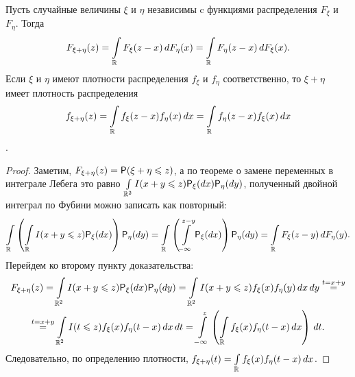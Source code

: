 \begin{lemma}[о свертке]
	Пусть случайные величины $\xi$ и $\eta$ независимы c функциями распределения $F_\xi$ и $F_\eta$. Тогда
	$$ F_{\xi + \eta} (z) = \int\limits_\R F_\xi (z - x) \, dF_\eta (x) = \int\limits_\R F_\eta(z - x) \, d F_\xi(x).$$
	Если $\xi$ и $\eta$ имеют плотности распределения $f_\xi$ и $f_\eta$ соответственно, то $\xi + \eta$ имеет плотность распределения 
	$$f_{\xi + \eta} (z) = \int\limits_\R f_\xi (z - x) f_\eta (x) \, dx = \int\limits_\R f_\eta (z - x) f_\xi(x) \, dx$$.
	\begin{proof}
		Заметим, $F_{\xi + \eta} (z) = \P ( \xi + \eta \leqslant z)$, а по теореме о замене переменных в интеграле Лебега это равно $\int\limits_{\R^2} I(x + y \leqslant z) \P_\xi(dx) \P_\eta(dy)$, полученный двойной интеграл по Фубини можно записать как повторный:
		$$ \int\limits_\R \left( \int\limits_\R I(x + y \leqslant z) \P_\xi(dx) \right) \P_\eta(dy) = \int\limits_\R \left( \int\limits_{-\infty}^{z-y} \P_\xi(dx) \right) \P_\eta(dy) = \int\limits_\R F_\xi(z - y) \, dF_\eta(y).$$
		Перейдем ко второму пункту доказательства:
		\begin{multline*}
			F_{\xi + \eta} (z) = \int\limits_{\R^2} I(x + y \leqslant z) \P_\xi(dx) \P_\eta(dy) = \int\limits_{\R^2} I(x + y \leqslant z) f_\xi(x) f_\eta(y) \, dx\,dy \overset{t = x+y}{=} \\ \overset{t = x+y}{=} \int\limits_{\R^2} I(t \leqslant z) f_\xi(x) f_\eta(t - x) \, dx\,dt = \int\limits_{-\infty}^z \left( \int\limits_\R f_\xi(x) f_\eta(t-x) \, dx \right) \, dt.
		\end{multline*}
		Следовательно, по определению плотности, $f_{\xi+\eta}(t) = \int\limits_\R f_\xi(x) f_\eta(t-x) \, dx$.
	\end{proof}
\end{lemma}
